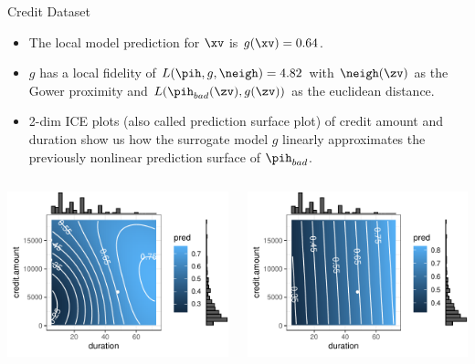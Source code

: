\documentclass[11pt,compress,t,notes=noshow, aspectratio=169, xcolor=table]{beamer}
\begin{document}
\begin{vbframe}{Credit Dataset}
\begin{itemize}
	\item The local model prediction for $\xv$ is $g(\xv) = 0.64$. 
	\item $g$ has a local fidelity of $L(\pih, g, \neigh) = 4.82$ with $\neigh(\zv)$ as the Gower proximity and $L(\pih_{bad}(\zv), g(\zv))$ as the euclidean distance. 
	\item 2-dim ICE plots (also called prediction surface plot) of credit amount and duration show us how the surrogate model $g$ linearly approximates the previously nonlinear prediction surface of $\pih_{bad}$. 
\end{itemize}
\vspace{-0.4cm}
 \begin{columns}
	\begin{column}{0.47\textwidth}
		\begin{center}
		\includegraphics[width=1\textwidth]{figure/lime_credit_ice1.pdf}
		\end{center}		
	\end{column}
	\begin{column}{0.46\textwidth}  
		\begin{center}
				\includegraphics[width=1\textwidth]{figure/lime_credit_ice2.pdf}
		\end{center}
			

\end{column}
\end{columns}
\end{vbframe}
\end{document}
